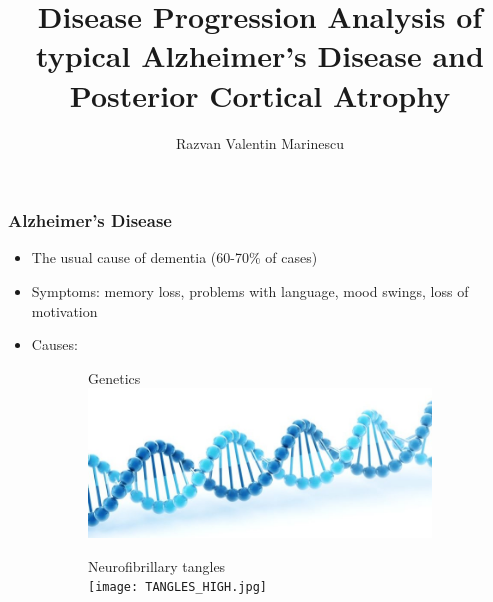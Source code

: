 \documentclass[10pt,xcolor=table]{beamer}
\title{Disease Progression Analysis of typical Alzheimer’s Disease and Posterior Cortical Atrophy}
\author{Razvan Valentin Marinescu}
\institute{Center for Medical Image Computing, University College London}
\date{}
\begin{document}
 
\frame{\titlepage}
 


\begin{frame}
\frametitle{Alzheimer's Disease}

\begin{itemize}
 \item The usual cause of dementia (60-70\% of cases)
 \item Symptoms: memory loss, problems with language, mood swings, loss of motivation
 \item Causes:
\end{itemize}

\vspace{-1em}
\begin{figure}
\centering
\begin{subfigure}{0.47\textwidth}
\centering
Genetics\\
\includegraphics[scale=0.15]{DNA.jpg}
\end{subfigure}
\begin{subfigure}{0.47\textwidth}
\centering
Neurofibrillary tangles\\
\texttt{[image: TANGLES\_HIGH.jpg]}
\end{subfigure}


\end{figure}
\end{frame}
\end{document}
